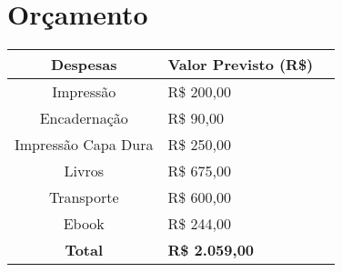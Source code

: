 \section{Orçamento}




\begin{small}
\begin{tabular}{clr}
\hline
 Despesas & Valor Previsto (R\$)   \\
\hline
 	Impressão & R\$ 200,00  \\
 	Encadernação & R\$ 90,00  \\
 	Impressão Capa Dura  & R\$ 250,00  \\
 	Livros  & R\$ 675,00  \\ 
 	Transporte & R\$ 600,00 \\
 	Ebook  & R\$ 244,00  \\ \hline
 	\textbf{Total} & \textbf{R\$ 2.059,00} \\
\hline
\end{tabular}


\end{small}









